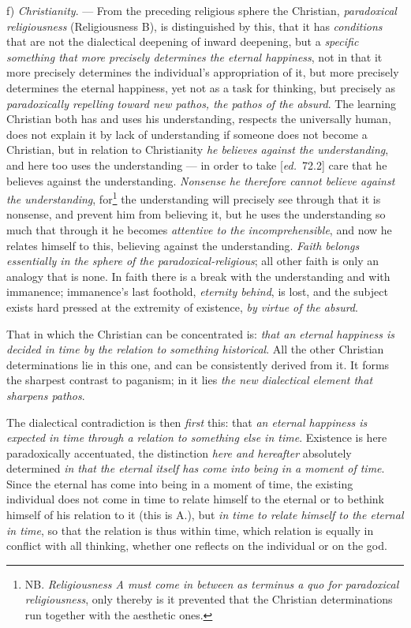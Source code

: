 \documentclass[12pt,a4paper,openany]{book}
\newcommand{\kpage}[1]{\marginnote{\footnotesize\textit{[#1]}}}
\newcommand{\ed}[1]{{\small[\textit{ed.}\ #1]}}
\begin{document}
f) \emph{Christianity}. --- From the preceding religious sphere the
Christian, \emph{paradoxical religiousness} (Religiousness B), is distinguished by this,
that it has \emph{conditions} that are not the dialectical deepening of inward deepening,
but a \emph{specific something that more precisely determines the eternal happiness},
not in that it more precisely determines the individual's appropriation of it, but
more precisely determines the eternal happiness, yet not as a task for
thinking, but precisely as \emph{paradoxically repelling toward new pathos, the pathos of
the absurd}. The learning Christian both has and uses his understanding, respects
the universally human, does not explain it by lack
of understanding if someone does not become a Christian, but in relation to
Christianity \emph{he believes against the understanding}, and here too uses the understanding
--- in order to take \ed{72.2} care that he believes against the understanding. \emph{Nonsense
\kpage{147}he therefore cannot believe against the understanding}, for\footnote[75]{NB. \emph{Religiousness A must come in between as terminus a quo for paradoxical religiousness}, only
thereby is it prevented that the Christian determinations run together with the aesthetic ones.}
the understanding will precisely see through
that it is nonsense, and prevent him from believing it, but he
uses the understanding so much that through it he becomes \emph{attentive to
the incomprehensible}, and now he relates himself to this, believing against the understanding.
\emph{Faith belongs essentially in the sphere of the paradoxical-religious}; all other
faith is only an analogy that is none. In faith there is a break with the understanding
and with immanence; immanence's last foothold, \emph{eternity
behind}, is lost, and the subject exists hard pressed at the extremity
of existence, \emph{by virtue of the absurd}.

That in which the Christian can be concentrated is: \emph{that an eternal happiness
is decided in time by the relation to something historical}. All the other Christian
determinations lie in this one, and can be consistently derived from
it. It forms the sharpest contrast to paganism; in
it lies \emph{the new dialectical element that sharpens pathos}.

The dialectical contradiction is then \emph{first} this: that \emph{an eternal happiness is expected
in time through a relation to something else in time}. Existence is here paradoxically
accentuated, the distinction \emph{here and hereafter} absolutely determined \emph{in that the eternal
itself has come into being in a moment of time}. Since the eternal has come into being in a moment of time,
the existing individual does not come in time to relate himself
to the eternal or to bethink himself of his relation to it (this is
A.), but \emph{in time to relate himself to the eternal in time}, so that the relation
is thus within time, which relation is equally in conflict with all thinking,
whether one reflects on the individual or on the god.
\end{document}

